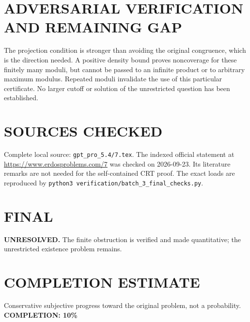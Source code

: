 \section{ADVERSARIAL VERIFICATION AND REMAINING GAP}
The projection condition is stronger than avoiding the original congruence, which is the direction needed. A positive density bound proves noncoverage for these finitely many moduli, but cannot be passed to an infinite product or to arbitrary maximum modulus. Repeated moduli invalidate the use of this particular certificate. No larger cutoff or solution of the unrestricted question has been established.

\section{SOURCES CHECKED}
Complete local source: \texttt{gpt\_pro\_5.4/7.tex}. The indexed official statement at \url{https://www.erdosproblems.com/7} was checked on 2026-09-23. Its literature remarks are not needed for the self-contained CRT proof. The exact loads are reproduced by \texttt{python3 verification/batch\_3\_final\_checks.py}.
\section{FINAL}
\textbf{UNRESOLVED.} The finite obstruction is verified and made quantitative; the unrestricted existence problem remains.
\section{COMPLETION ESTIMATE}
Conservative subjective progress toward the original problem, not a probability.
\textbf{COMPLETION: 10\%}
